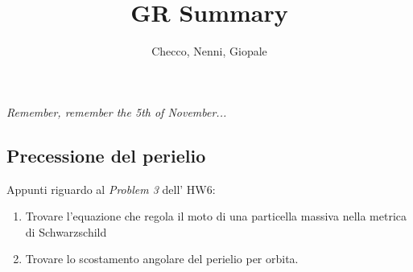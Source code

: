 \documentclass[a4paper]{article}
\newcommand{\thedate}{October 20, 2020}
\begin{document}
\hypersetup{linkcolor = black}
\hypersetup{linkcolor = blue}
\thispagestyle{plain}
\author{Checco, Nenni, Giopale}
\title{GR Summary}
\maketitle
    
    



\noindent
\begin{center}
\textit{Remember, remember the 5th of November...}
\end{center}
\subsection*{Precessione del perielio}

Appunti riguardo al \textit{Problem 3} dell' HW6:
\begin{enumerate}
  \item Trovare l'equazione che regola il moto di una particella massiva nella metrica di Schwarzschild 
  \item Trovare lo scostamento angolare del perielio per orbita.
\end{enumerate}
\end{document}
